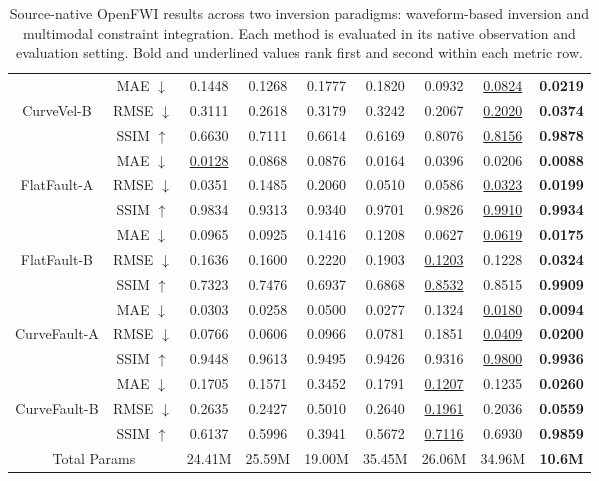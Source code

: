 \begin{table}[t]
\begin{tabular*}{\textwidth}{@{\extracolsep{\fill}}c c c c c c c c c@{}}
		\addlinespace[2pt]
		& MAE $\downarrow$ & 0.1448 & 0.1268 & 0.1777 & 0.1820 & 0.0932 & \underline{0.0824} & \textbf{0.0219} \\
		CurveVel-B & RMSE $\downarrow$ & 0.3111 & 0.2618 & 0.3179 & 0.3242 & 0.2067 & \underline{0.2020} & \textbf{0.0374} \\
		& SSIM $\uparrow$ & 0.6630 & 0.7111 & 0.6614 & 0.6169 & 0.8076 & \underline{0.8156} & \textbf{0.9878} \\
		\midrule
		& MAE $\downarrow$ & \underline{0.0128} & 0.0868 & 0.0876 & 0.0164 & 0.0396 & 0.0206 & \textbf{0.0088} \\
		FlatFault-A & RMSE $\downarrow$ & 0.0351 & 0.1485 & 0.2060 & 0.0510 & 0.0586 & \underline{0.0323} & \textbf{0.0199} \\
		& SSIM $\uparrow$ & 0.9834 & 0.9313 & 0.9340 & 0.9701 & 0.9826 & \underline{0.9910} & \textbf{0.9934} \\
		\addlinespace[2pt]
		& MAE $\downarrow$ & 0.0965 & 0.0925 & 0.1416 & 0.1208 & 0.0627 & \underline{0.0619} & \textbf{0.0175} \\
		FlatFault-B & RMSE $\downarrow$ & 0.1636 & 0.1600 & 0.2220 & 0.1903 & \underline{0.1203} & 0.1228 & \textbf{0.0324} \\
		& SSIM $\uparrow$ & 0.7323 & 0.7476 & 0.6937 & 0.6868 & \underline{0.8532} & 0.8515 & \textbf{0.9909} \\
		\midrule
		& MAE $\downarrow$ & 0.0303 & 0.0258 & 0.0500 & 0.0277 & 0.1324 & \underline{0.0180} & \textbf{0.0094} \\
		CurveFault-A & RMSE $\downarrow$ & 0.0766 & 0.0606 & 0.0966 & 0.0781 & 0.1851 & \underline{0.0409} & \textbf{0.0200} \\
		& SSIM $\uparrow$ & 0.9448 & 0.9613 & 0.9495 & 0.9426 & 0.9316 & \underline{0.9800} & \textbf{0.9936} \\
		\addlinespace[2pt]
		& MAE $\downarrow$ & 0.1705 & 0.1571 & 0.3452 & 0.1791 & \underline{0.1207} & 0.1235 & \textbf{0.0260} \\
		CurveFault-B & RMSE $\downarrow$ & 0.2635 & 0.2427 & 0.5010 & 0.2640 & \underline{0.1961} & 0.2036 & \textbf{0.0559} \\
		& SSIM $\uparrow$ & 0.6137 & 0.5996 & 0.3941 & 0.5672 & \underline{0.7116} & 0.6930 & \textbf{0.9859} \\
		\midrule
		\multicolumn{2}{c}{Total Params} & 24.41M & 25.59M & 19.00M & 35.45M & 26.06M & 34.96M & \textbf{10.6M} \\
		\bottomrule
	\end{tabular*}
	\caption{Source-native OpenFWI results across two inversion paradigms: waveform-based inversion and multimodal constraint integration. Each method is evaluated in its native observation and evaluation setting. Bold and underlined values rank first and second within each metric row.}
	\label{tab:main-comparison}
\end{table}

